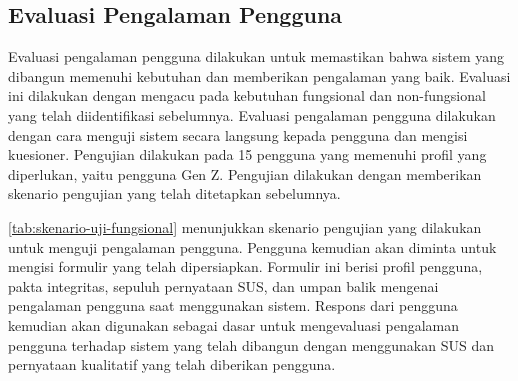 \subsection{Evaluasi Pengalaman Pengguna}
\label{subsec:evaluasi-pengalaman-pengguna}
Evaluasi pengalaman pengguna dilakukan untuk memastikan bahwa sistem yang dibangun memenuhi kebutuhan dan memberikan pengalaman yang baik. Evaluasi ini dilakukan dengan mengacu pada kebutuhan fungsional dan non-fungsional yang telah diidentifikasi sebelumnya. Evaluasi pengalaman pengguna dilakukan dengan cara menguji sistem secara langsung kepada pengguna dan mengisi kuesioner. Pengujian dilakukan pada 15 pengguna yang memenuhi profil yang diperlukan, yaitu pengguna Gen Z. Pengujian dilakukan dengan memberikan skenario pengujian yang telah ditetapkan sebelumnya. 

\autoref{tab:skenario-uji-fungsional} menunjukkan skenario pengujian yang dilakukan untuk menguji pengalaman pengguna. Pengguna kemudian akan diminta untuk mengisi formulir yang telah dipersiapkan. Formulir ini berisi profil pengguna, pakta integritas, sepuluh pernyataan SUS, dan umpan balik mengenai pengalaman pengguna saat menggunakan sistem. Respons dari pengguna kemudian akan digunakan sebagai dasar untuk mengevaluasi pengalaman pengguna terhadap sistem yang telah dibangun dengan menggunakan SUS dan pernyataan kualitatif yang telah diberikan pengguna.
